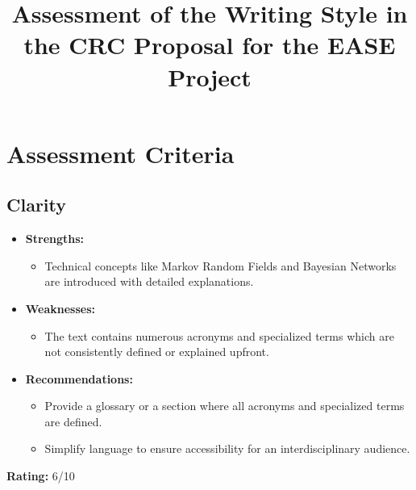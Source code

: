 \documentclass{article}
\begin{document}
\title{Assessment of the Writing Style in the CRC Proposal for the EASE Project}
\author{}
\date{}
\maketitle

\section{Assessment Criteria}

\subsection{Clarity}
\begin{itemize}
    \item \textbf{Strengths:}
    \begin{itemize}
        \item Technical concepts like Markov Random Fields and Bayesian Networks are introduced with detailed explanations.
    \end{itemize}

    \item \textbf{Weaknesses:}
    \begin{itemize}
        \item The text contains numerous acronyms and specialized terms which are not consistently defined or explained upfront.
    \end{itemize}

    \item \textbf{Recommendations:}
    \begin{itemize}
        \item Provide a glossary or a section where all acronyms and specialized terms are defined.
        \item Simplify language to ensure accessibility for an interdisciplinary audience.
    \end{itemize}
\end{itemize}

\textbf{Rating:} 6/10
\end{document}

